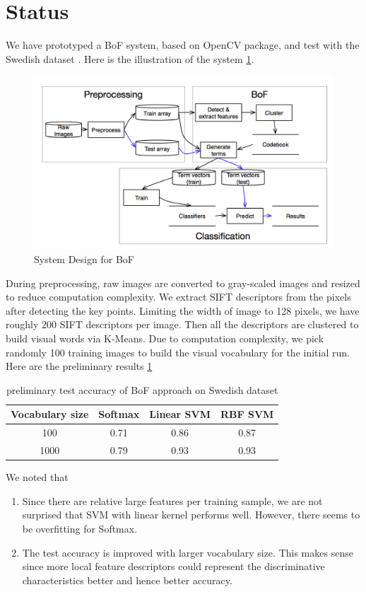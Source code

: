 \documentclass{article}
\begin{document}
\section{Status}
We have prototyped a BoF system, based on OpenCV package, and test with the Swedish dataset \cite{SwedishLeafDataset}. Here is the illustration of the system \ref{fig:bofsystemdesign}.
\begin{figure} 
  \centering
  \includegraphics[width=\textwidth]{flowchart}
  \caption{ System Design for BoF }
  \label{fig:bofsystemdesign}
\end{figure}
During preprocessing, raw images are converted to gray-scaled images and resized to reduce computation complexity. We extract SIFT descriptors from the pixels after detecting the key points. Limiting the width of image to 128 pixels, we have roughly 200 SIFT descriptors per image. Then all the descriptors are clustered to build visual words via K-Means. Due to computation complexity, we pick randomly 100 training images to build the visual vocabulary for the initial run.  Here are the preliminary results \ref{table:prelimaryresult}
\begin{table}
  \caption {preliminary test accuracy of BoF approach on Swedish dataset}
  \centering
  \begin{tabular} { c c c c}
    \hline\hline
    Vocabulary size & Softmax &  Linear SVM  & RBF SVM \\
    \hline
    100  &  0.71 & 0.86 & 0.87\\
    1000 &  0.79 & 0.93 & 0.93
  \end{tabular}
  \label{table:prelimaryresult}
\end{table}


We noted that
\begin{enumerate}
  \item Since there are relative large features per training sample, we are not surprised that SVM with linear kernel performs well. However, there seems to be overfitting for Softmax.
  \item The test accuracy is improved with larger vocabulary size. This makes sense since more local feature descriptors could represent the discriminative characteristics better and hence better accuracy.
\end{enumerate}
\end{document}
